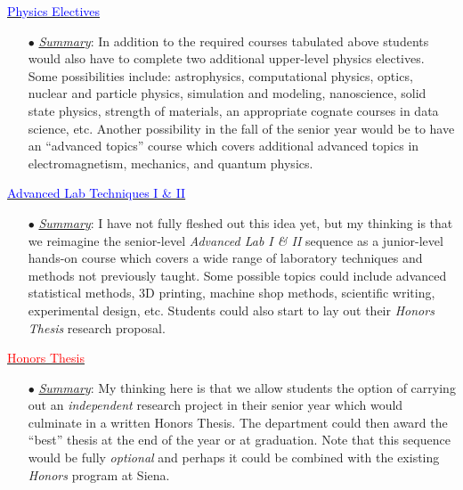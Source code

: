\documentclass[12pt,preprint]{aastex}
\newcommand{\red}[1]{\textcolor{red}{#1}}
\newcommand{\blue}[1]{\textcolor{blue}{#1}}
\begin{document}
\begin{itemize*}
\item{\underline{\blue{Physics Electives}}
  \begin{itemize}
    \item[$\bullet$]{\underline{\em Summary}: In addition to the required
      courses tabulated above students would also have to complete two
      additional upper-level physics electives.  Some possibilities include:
      astrophysics, computational physics, optics, nuclear and particle physics,
      simulation and modeling, nanoscience, solid state physics, strength of
      materials, an appropriate cognate courses in data science, etc.  Another
      possibility in the fall of the senior year would be to have an ``advanced
      topics'' course which covers additional advanced topics in
      electromagnetism, mechanics, and quantum physics.}
  \end{itemize}
}

\item{\underline{\blue{Advanced Lab Techniques I \& II}}
  \begin{itemize}
    \item[$\bullet$]{\underline{\em Summary}: I have not fully fleshed out this
      idea yet, but my thinking is that we reimagine the senior-level {\em
        Advanced Lab I \& II} sequence as a junior-level hands-on course which
      covers a wide range of laboratory techniques and methods not previously
      taught.  Some possible topics could include advanced statistical methods, 
      3D printing, machine shop methods, scientific writing, experimental
      design, etc.  Students could also start to lay out their {\em Honors
        Thesis} research proposal.}
  \end{itemize}
}

\item{\underline{\red{Honors Thesis}}
  \begin{itemize}
    \item[$\bullet$]{\underline{\em Summary}: My thinking here is that we allow
      students the option of carrying out an \emph{independent} research project
      in their senior year which would culminate in a written Honors Thesis.
      The department could then award the ``best'' thesis at the end of the year
      or at graduation.  Note that this sequence would be fully \emph{optional}
      and perhaps it could be combined with the existing \emph{Honors} program
      at Siena.}
  \end{itemize}
}
\end{itemize*}
\end{document}
